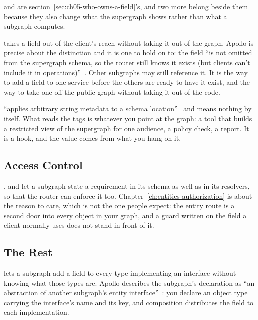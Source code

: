 %
 and  are
section~\ref{sec:ch05-who-owns-a-field}'s, and two more belong beside them
because they also change what the supergraph shows rather than what a subgraph
computes.

%
 takes a field out of the client's reach without taking it
out of the graph. Apollo is precise about the distinction and it is one to
hold on to: the field \enquote{is not omitted from the supergraph schema, so
the router still knows it exists (but clients can't include it in
operations)}~\autocite{apollodirectives}. Other subgraphs may still reference
it. It is the way to add a field to one service before the others are ready to
have it exist, and the way to take one off the public graph without taking it
out of the code.

%
 \enquote{applies arbitrary string metadata to a schema
location}~\autocite{apollodirectives} and means nothing by itself. What reads
the tags is whatever you point at the graph: a tool that builds a restricted
view of the supergraph for one audience, a policy check, a report. It is a
hook, and the value comes from what you hang on it.

\subsection{Access Control}

%
,  and  let a subgraph
state a requirement in its schema as well as in its resolvers, so that the
router can enforce it too. Chapter~\ref{ch:entities-authorization}
is about the reason to care, which is not the one people expect: the entity
route is a second door into every object in your graph, and a guard written on
the field a client normally uses does not stand in front of it.

\subsection{The Rest}

%
 lets a subgraph add a field to every type implementing
an interface without knowing what those types are. Apollo describes the
subgraph's declaration as \enquote{an abstraction of another subgraph's entity
interface}~\autocite{apollodirectives}: you declare an object type carrying the
interface's name and its key, and composition distributes the field to each
implementation.

